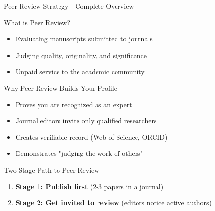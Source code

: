 \documentclass[11pt]{beamer}
\begin{document}
				\begin{frame}{Peer Review Strategy - Complete Overview}
					\scriptsize
					\begin{block}{What is Peer Review?}
						\begin{itemize}
							\item Evaluating manuscripts submitted to journals
							\item Judging quality, originality, and significance
							\item Unpaid service to the academic community
						\end{itemize}
					\end{block}
					\begin{block}{Why Peer Review Builds Your Profile}
						\begin{itemize}
							\item Proves you are recognized as an expert
							\item Journal editors invite only qualified researchers
							\item Creates verifiable record (Web of Science, ORCID)
							\item Demonstrates "judging the work of others"
						\end{itemize}
					\end{block}
					\begin{block}{Two-Stage Path to Peer Review}
						\begin{enumerate}
							\item \textbf{Stage 1: Publish first} (2-3 papers in a journal)
							\item \textbf{Stage 2: Get invited to review} (editors notice active authors)
						\end{enumerate}
					\end{block}
				\end{frame}
				
\end{document}
